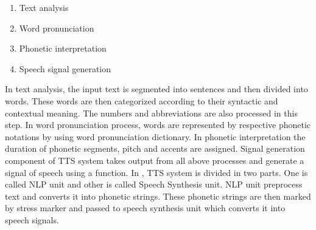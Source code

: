 \begin{enumerate}
  \item Text analysis
  \item Word pronunciation
  \item Phonetic interpretation
  \item Speech signal generation
\end{enumerate}

In text analysis, the input text is segmented into sentences and then divided into words. These words are then categorized according to their syntactic and contextual meaning. The numbers and abbreviations are also processed in this step. In word pronunciation process, words are represented by respective phonetic notations by using word pronunciation dictionary. In phonetic interpretation the duration of phonetic segments, pitch and accents are assigned. Signal generation component of TTS system takes output from all above processes and generate a signal of speech using a function. In \cite{urdu_text_preprocessing}, TTS system is divided in two parts. One is called NLP unit and other is called Speech Synthesis unit. NLP unit preprocess text and converts it into phonetic strings. These phonetic strings are then marked by stress marker and passed to speech synthesis unit which converts it into speech signals.
